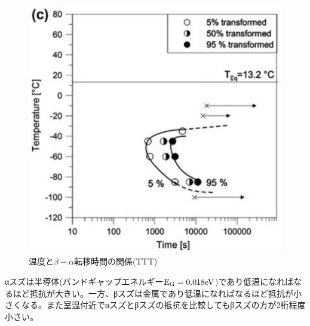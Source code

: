 \begin{figure}[htb]
    \begin{center}
   \includegraphics[width=130mm]{Introduction/TTT.eps}
  \end{center}
  \caption{温度と$\beta-\alpha$転移時間の関係(TTT)\cite{Nogita}}
  \label{fig:TTT}
\end{figure}

αスズは半導体(バンドギャップエネルギー$\rm E_G=0.018eV$)であり低温になればなるほど抵抗が大きい。一方、βスズは金属であり低温になればなるほど抵抗が小さくなる。また室温付近でαスズとβスズの抵抗を比較してもβスズの方が2桁程度小さい。\cite{}

